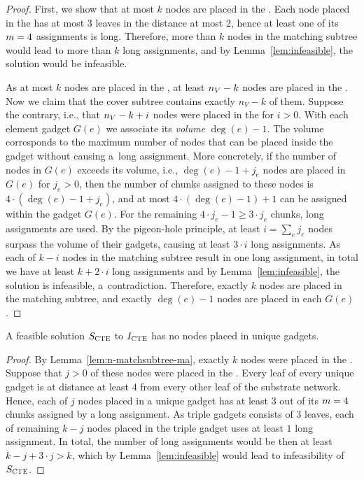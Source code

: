 \begin{proof}
  First, we show that at most $k$ nodes are placed in the \MatchSubtree.
  Each node placed in the \MatchSubtree{} has at most $3$ leaves in the distance at most $2$, hence at least one of its $m=4$ assignments is long.
  Therefore, more than $k$ nodes in the matching subtree would lead to more than $k$ long assignments, and by Lemma~\ref{lem:infeasible}, the solution would be infeasible.
  
  As at most $k$ nodes are placed in the \MatchSubtree{}, at least $n_V-k$ nodes are placed in the \CoverSubtree.
  Now we claim that the cover subtree contains exactly $n_V-k$ of them.
  Suppose the contrary, i.e., that $n_V-k+i$ nodes were placed in the \CoverSubtree{} for $i > 0$.
  With each element gadget $G(e)$ we associate its \emph{volume} $\deg(e) - 1$.
  The volume corresponds to the maximum number of nodes that can be placed inside the gadget without causing a~long assignment.
  More concretely, if the number of nodes in $G(e)$ exceeds its volume, i.e., $\deg(e) - 1 + j_e$ nodes are placed in $G(e)$ for $j_e > 0$,
  then the number of chunks assigned to these nodes is $4\cdot (\deg(e) - 1 + j_e)$, and at most $4\cdot (\deg(e) - 1) + 1$ can be assigned within the gadget $G(e)$.
  For the remaining $4\cdot j_e - 1 \geq 3\cdot j_e$ chunks, long assignments are used.
  By the pigeon-hole principle, at least $i = \sum_e j_e$ nodes surpass the volume of their gadgets, causing at least $3\cdot i$ long assignments.
  As each of $k-i$ nodes in the matching subtree result in one long assignment, in total we have at least $k+2\cdot i$ long assignments and by Lemma~\ref{lem:infeasible}, the solution is infeasible, a~contradiction.
  Therefore, exactly $k$ nodes are placed in the matching subtree, and exactly $\deg(e) - 1$ nodes are placed in each $G(e)$.
\end{proof}

\begin{lemma}
  A feasible solution $S_{\mathrm{\textsc{CTE}}}$ to $I_{\mathrm{\textsc{CTE}}}$ has no nodes placed in unique gadgets.
  \label{lem:no-unq-ma}
\end{lemma}
\begin{proof}
  By Lemma~\ref{lem:n-matchsubtree-ma}, exactly $k$ nodes were placed in the \MatchSubtree{}.
  Suppose that $j>0$ of these nodes were placed in the \UnqGadgets{}.
  Every leaf of every unique gadget is at distance at least $4$ from every other leaf of the substrate network.
  Hence, each of $j$ nodes placed in a unique gadget has at least $3$ out of its $m = 4$ chunks assigned by a long assignment.
  As triple gadgets consists of $3$ leaves, each of remaining $k-j$ nodes placed in the triple gadget uses at least $1$ long assignment.
  In total, the number of long assignments would be then at least $k-j + 3\cdot j > k$, which by Lemma~\ref{lem:infeasible} would lead to infeasibility of $S_{\mathrm{\textsc{CTE}}}$.
\end{proof}

